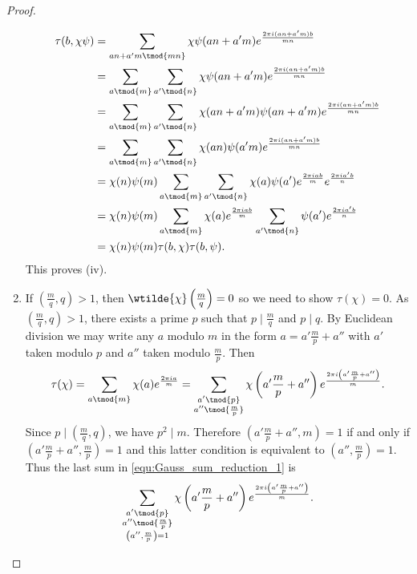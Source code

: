 \begin{proof}
\begin{enumerate}[label=(\roman*)]
            \begin{align*}
              \tau(b,\chi\psi) &= \sum_{an+a'm \tmod{mn}}\chi\psi(an+a'm)e^{\frac{2\pi i(an+a'm)b}{mn}} \\
              &= \sum_{a\tmod{m}}\sum_{a'\tmod{n}}\chi\psi(an+a'm)e^{\frac{2\pi i(an+a'm)b}{mn}} \\
              &= \sum_{a\tmod{m}}\sum_{a'\tmod{n}}\chi(an+a'm)\psi(an+a'm)e^{\frac{2\pi i(an+a'm)b}{mn}} \\
              &= \sum_{a\tmod{m}}\sum_{a'\tmod{n}}\chi(an)\psi(a'm)e^{\frac{2\pi i(an+a'm)b}{mn}} \\
              &= \chi(n)\psi(m)\sum_{a\tmod{m}}\sum_{a'\tmod{n}}\chi(a)\psi(a')e^{\frac{2\pi iab}{m}}e^{\frac{2\pi ia'b}{n}} \\
              &= \chi(n)\psi(m)\sum_{a\tmod{m}}\chi(a)e^{\frac{2\pi iab}{m}}\sum_{a'\tmod{n}}\psi(a')e^{\frac{2\pi ia'b}{n}} \\
              &= \chi(n)\psi(m)\tau(b,\chi)\tau(b,\psi).
            \end{align*}
            This proves (iv).
            \item If $\left(\frac{m}{q},q\right) > 1$, then $\wtilde{\chi}\left(\frac{m}{q}\right) = 0$ so we need to show $\tau(\chi) = 0$. As $\left(\frac{m}{q},q\right) > 1$, there exists a prime $p$ such that $p \mid \frac{m}{q}$ and $p \mid q$. By Euclidean division we may write any $a$ modulo $m$ in the form $a = a'\frac{m}{p}+a''$ with $a'$ taken modulo $p$ and $a''$ taken modulo $\frac{m}{p}$. Then
            \begin{equation}\label{equ:Gauss_sum_reduction_1}
              \tau(\chi) = \sum_{a \tmod{m}}\chi(a)e^{\frac{2\pi ia}{m}} = \sum_{\substack{a' \tmod{p} \\ a'' \tmod{\frac{m}{p}}}}\chi\left(a'\frac{m}{p}+a''\right)e^{\frac{2\pi i\left(a'\frac{m}{p}+a''\right)}{m}}.
            \end{equation}
            Since $p \mid \left(\frac{m}{q},q\right)$, we have $p^{2} \mid m$. Therefore $\left(a'\frac{m}{p}+a'',m\right) = 1$ if and only if $\left(a'\frac{m}{p}+a'',\frac{m}{p}\right) = 1$ and this latter condition is equivalent to $\left(a'',\frac{m}{p}\right) = 1$. Thus the last sum in \cref{equ:Gauss_sum_reduction_1} is
            \[
              \sum_{\substack{a' \tmod{p} \\ a'' \tmod{\frac{m}{p}} \\ \left(a'',\frac{m}{p}\right) = 1}}\chi\left(a'\frac{m}{p}+a''\right)e^{\frac{2\pi i\left(a'\frac{m}{p}+a''\right)}{m}}.
\]
\end{enumerate}
\end{proof}
